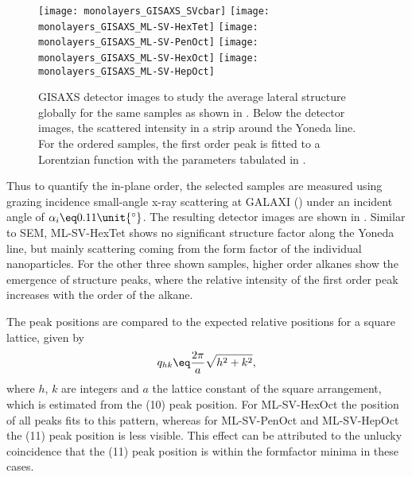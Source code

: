 \documentclass[\main/dresen_thesis.tex]{subfiles}
\begin{document}
  \begin{figure}[tb]
    \centering
    \texttt{[image: monolayers\_GISAXS\_SVcbar]}
    \texttt{[image: monolayers\_GISAXS\_ML-SV-HexTet]}
    \texttt{[image: monolayers\_GISAXS\_ML-SV-PenOct]}
    \texttt{[image: monolayers\_GISAXS\_ML-SV-HexOct]}
    \texttt{[image: monolayers\_GISAXS\_ML-SV-HepOct]}
    \caption{\label{fig:monolayers:preparation:solventVariation:gisaxs}GISAXS detector images to study the average lateral structure globally for the same samples as shown in . Below the detector images, the scattered intensity in a strip around the Yoneda line. For the ordered samples, the first order peak is fitted to a Lorentzian function with the parameters tabulated in .}
  \end{figure}
  Thus to quantify the in-plane order, the selected samples are measured using grazing incidence small-angle x-ray scattering at GALAXI () under an incident angle of $\alpha_i \eq 0.11 \unit{^\circ}$.
  The resulting detector images are shown in .
  Similar to SEM, ML-SV-HexTet shows no significant structure factor along the Yoneda line, but mainly scattering coming from the form factor of the individual nanoparticles.
  For the other three shown samples, higher order alkanes show the emergence of structure peaks, where the relative intensity of the first order peak increases with the order of the alkane.

  The peak positions are compared to the expected relative positions for a square lattice, given by
  \begin{align}
    q_{hk} \eq \frac{2 \pi}{a} \sqrt{h^2 + k^2},
  \end{align}
  where $h$, $k$ are integers and $a$ the lattice constant of the square arrangement, which is estimated from the (10) peak position.
  For ML-SV-HexOct the position of all peaks fits to this pattern, whereas for ML-SV-PenOct and ML-SV-HepOct the (11) peak position is less visible.
  This effect can be attributed to the unlucky coincidence that the (11) peak position is within the formfactor minima in these cases.
\end{document}
